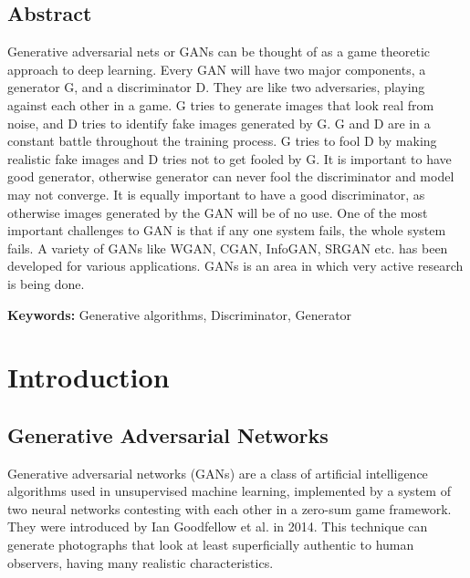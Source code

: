 \documentclass[12pt, a4paper]{report}
\begin{document}
    \newpage
    \begin{center}
    \section*{Abstract}
    \justify
    \begin{doublespace}
    Generative adversarial nets or GANs can be thought of as a game theoretic 
    approach to deep learning. Every GAN will have two major components, 
    a generator G, and a discriminator D. They are like two adversaries, playing 
    against each other in a game. G tries to generate images that look real from 
    noise, and D tries to identify fake images generated by G. G and D are in a 
    constant battle throughout the training process. G tries to fool D by making 
    realistic fake images and D tries not to get fooled by G. It is important to 
    have good generator, otherwise generator can never fool the discriminator 
    and model may not converge. It is equally important to have a good 
    discriminator, as otherwise images generated by the GAN will be of no use. 
    One of the most important challenges to GAN is that if any one system fails, 
    the whole system fails. A variety of GANs like WGAN, CGAN, InfoGAN, SRGAN 
    etc. has been developed for various applications. GANs is an area in which 
    very active research is being done.
    
    \noindent\textbf{Keywords:} Generative algorithms, Discriminator, Generator
    \end{doublespace}
    \end{center}

    \newpage
    \tableofcontents

    \chapter{Introduction}
    \section{Generative Adversarial Networks}
    Generative adversarial networks (GANs) are a class of artificial intelligence 
    algorithms used in unsupervised machine learning, implemented by a system of 
    two neural networks contesting with each other in a zero-sum game framework. 
    They were introduced by Ian Goodfellow et al. in 2014\cite{base}. This technique 
    can generate photographs that look at least superficially authentic to human 
    observers, having many realistic characteristics.\cite{improvedtechniques}
\end{document}
